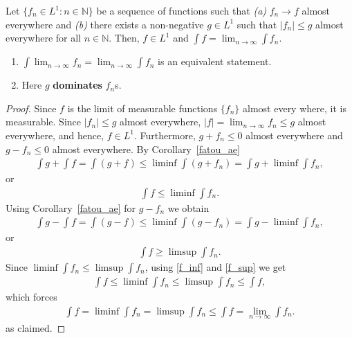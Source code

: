 \documentclass[a4paper,english,12pt]{article}
\begin{document}
\begin{thm} Let $\{f_n\in L^1:n\in \mathbb{N}\}$ be a sequence of functions such that \textit{(a)} $f_n\rightarrow f$ almost everywhere and \textit{(b)} there exists a non-negative $g\in L^1$ such that $|f_n|\leqslant g$ almost everywhere for all $n\in \mathbb{N}$. Then, $f\in L^1$ and $\int f=\lim_{n\rightarrow\infty}\int f_n$.
\end{thm}
\begin{rem} 
\begin{enumerate}[\itshape(i)]
\item $\int\lim_{n\rightarrow\infty} f_n=\lim_{n\rightarrow\infty}\int f_n$ is an equivalent statement.
\item Here $g$ \textbf{dominates} $f_n$s.
\end{enumerate}
\end{rem}
\begin{proof} Since $f$ is the limit of measurable functions $\{f_n\}$ almost every where, it is measurable. Since $|f_n|\leqslant g$ almost everywhere, $|f|=\lim_{n\rightarrow\infty}f_n\leqslant g$ almost everywhere, and hence, $f\in L^1$. Furthermore, $g+f_n\leqslant 0$ almost everywhere and $g-f_n\leqslant 0$ almost everywhere. By Corollary~\ref{fatou_ae}
	\begin{align*}
		\int g+\int f=\int (g+f)\leqslant \liminf \int (g+f_n)=\int g + \liminf \int f_n,
	\end{align*}
or 
	\begin{align}
		\int f\leqslant \liminf \int f_n.
		\label{f_inf}
	\end{align}
Using Corollary~\ref{fatou_ae} for $g-f_n$ we obtain
	\begin{align*}
		\int g-\int f=\int (g-f)\leqslant \liminf \int (g-f_n)=\int g - \liminf \int f_n,
	\end{align*}
or 
	\begin{align}
		\int f\geqslant \limsup \int f_n.
		\label{f_sup}
	\end{align}
Since $\liminf \int f_n\leqslant \limsup \int f_n$, using \ref{f_inf} and \ref{f_sup} we get 
	\begin{align*}
		\int f\leqslant \liminf \int f_n\leqslant \limsup \int f_n\leqslant\int f,
	\end{align*}
which forces 
	\begin{align*}
		\int f= \liminf \int f_n= \limsup \int f_n\leqslant\int f=\lim_{n\rightarrow\infty}\int f_n.
	\end{align*}
as claimed.	
\end{proof}
\end{document}
